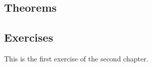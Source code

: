 \subsection{Theorems}
\subsection{Exercises}
\begin{exercise}
    This is the first exercise of the second chapter.
\end{exercise}